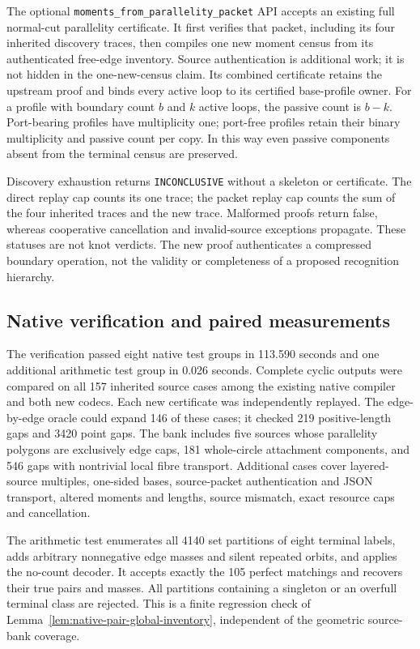 The optional \texttt{moments\_from\_parallelity\_packet} API accepts an
existing full normal-cut parallelity certificate.  It first verifies that
packet, including its four inherited discovery traces, then compiles one
new moment census from its authenticated free-edge inventory.  Source
authentication is additional work; it is not hidden in the one-new-census
claim.  Its combined certificate retains the upstream proof and binds
every active loop to its certified base-profile owner.  For a profile with
boundary count $b$ and $k$ active loops, the passive count is $b-k$.
Port-bearing profiles have multiplicity one; port-free profiles retain
their binary multiplicity and passive count per copy.  In this way even
passive components absent from the terminal census are preserved.

Discovery exhaustion returns \texttt{INCONCLUSIVE} without a skeleton or
certificate.  The direct replay cap counts its one trace; the packet
replay cap counts the sum of the four inherited traces and the new trace.
Malformed proofs return false, whereas cooperative cancellation and
invalid-source exceptions propagate.  These statuses are not knot
verdicts.  The new proof authenticates a compressed boundary operation,
not the validity or completeness of a proposed recognition hierarchy.

\subsection{Native verification and paired measurements}
\label{subsec:native-moment-measurements}

The verification passed eight native test groups in 113.590 seconds and
one additional arithmetic test group in 0.026 seconds.  Complete cyclic
outputs were compared on all 157 inherited source cases among the existing
native compiler and both new codecs.  Each new certificate was independently
replayed.  The edge-by-edge oracle could expand 146 of these cases; it
checked 219 positive-length gaps and 3420 point gaps.  The bank includes
five sources whose parallelity polygons are exclusively edge caps,
181 whole-circle attachment components, and 546 gaps with nontrivial local
fibre transport.  Additional cases cover layered-source multiples,
one-sided bases, source-packet authentication and JSON transport, altered
moments and lengths, source mismatch, exact resource caps and cancellation.

The arithmetic test enumerates all 4140 set partitions of eight terminal
labels, adds arbitrary nonnegative edge masses and silent repeated orbits,
and applies the no-count decoder.  It accepts exactly the 105 perfect
matchings and recovers their true pairs and masses.  All partitions
containing a singleton or an overfull terminal class are rejected.  This
is a finite regression check of
Lemma~\ref{lem:native-pair-global-inventory}, independent of the geometric
source-bank coverage.

